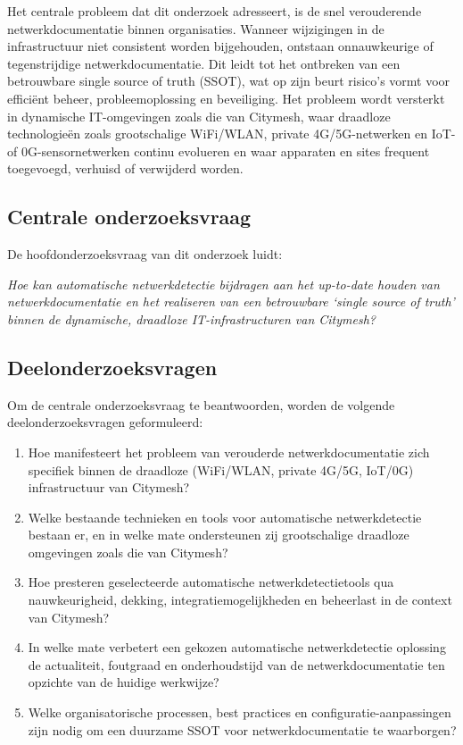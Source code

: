 Het centrale probleem dat dit onderzoek adresseert, is de snel verouderende netwerkdocumentatie binnen organisaties. Wanneer wijzigingen in de infrastructuur niet consistent worden bijgehouden, ontstaan onnauwkeurige of tegenstrijdige netwerkdocumentatie. Dit leidt tot het ontbreken van een betrouwbare single source of truth (SSOT), wat op zijn beurt risico's vormt voor efficiënt beheer, probleemoplossing en beveiliging.\autocite{Campbell2007} Het probleem wordt versterkt in dynamische IT-omgevingen zoals die van Citymesh, waar draadloze technologieën zoals grootschalige WiFi/WLAN, private 4G/5G-netwerken en IoT- of 0G-sensornetwerken continu evolueren en waar apparaten en sites frequent toegevoegd, verhuisd of verwijderd worden.\autocite{CitymeshAbout,CitymeshWiFi,CitymeshPrivate5G}

\subsection{Centrale onderzoeksvraag}

De hoofdonderzoeksvraag van dit onderzoek luidt:

\textit{Hoe kan automatische netwerkdetectie bijdragen aan het up-to-date houden van netwerkdocumentatie en het realiseren van een betrouwbare `single source of truth' binnen de dynamische, draadloze IT-infrastructuren van Citymesh?}

\subsection{Deelonderzoeksvragen}

Om de centrale onderzoeksvraag te beantwoorden, worden de volgende deelonderzoeksvragen geformuleerd:

\begin{enumerate}
  \item Hoe manifesteert het probleem van verouderde netwerkdocumentatie zich specifiek binnen de draadloze (WiFi/WLAN, private 4G/5G, IoT/0G) infrastructuur van Citymesh?
  \item Welke bestaande technieken en tools voor automatische netwerkdetectie bestaan er, en in welke mate ondersteunen zij grootschalige draadloze omgevingen zoals die van Citymesh?
  \item Hoe presteren geselecteerde automatische netwerkdetectietools qua nauwkeurigheid, dekking, integratiemogelijkheden en beheerlast in de context van Citymesh?
  \item In welke mate verbetert een gekozen automatische netwerkdetectie oplossing de actualiteit, foutgraad en onderhoudstijd van de netwerkdocumentatie ten opzichte van de huidige werkwijze?
  \item Welke organisatorische processen, best practices en configuratie-aanpassingen zijn nodig om een duurzame SSOT voor netwerkdocumentatie te waarborgen?
\end{enumerate}

